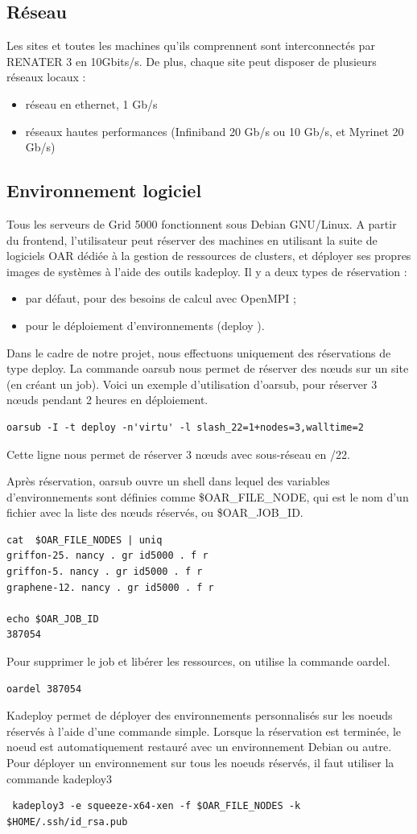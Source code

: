 \subsection{Réseau}
Les sites et toutes les machines qu'ils comprennent sont interconnectés par RENATER 3 en 10Gbits/s. De
plus, chaque site peut disposer de plusieurs réseaux locaux :
\begin{itemize}
\item réseau en ethernet, 1 Gb/s
\item réseaux hautes performances (Infiniband 20 Gb/s ou 10 Gb/s, et Myrinet 20 Gb/s)
\end{itemize}

  \subsection{Environnement logiciel}
Tous les serveurs de Grid 5000 fonctionnent sous Debian GNU/Linux.
A partir du frontend, l'utilisateur peut réserver des machines en utilisant la suite de logiciels OAR dédiée à
la gestion de ressources de clusters, et déployer ses propres images de systèmes à l'aide des outils kadeploy.
Il y a deux types de réservation :
\begin{itemize}
\item par défaut, pour des besoins de calcul avec OpenMPI ;
\item pour le déploiement d'environnements (deploy ).
\end{itemize}
Dans le cadre de notre projet, nous effectuons uniquement des réservations de type deploy. La commande oarsub nous permet de réserver des nœuds sur un site (en créant un job). Voici un exemple d'utilisation d'oarsub, pour réserver 3 nœuds pendant 2 heures en déploiement.
\begin{lstlisting}
oarsub -I -t deploy -n'virtu' -l slash_22=1+nodes=3,walltime=2
\end{lstlisting}
Cette ligne nous permet de réserver 3 nœuds avec sous-réseau en /22.

Après réservation, oarsub ouvre un shell dans lequel des variables d'environnements sont définies comme \$OAR\_FILE\_NODE, qui est le nom d'un fichier avec la liste des nœuds réservés, ou \$OAR\_JOB\_ID.
\begin{lstlisting}
cat  $OAR_FILE_NODES | uniq
griffon-25. nancy . gr id5000 . f r
griffon-5. nancy . gr id5000 . f r
graphene-12. nancy . gr id5000 . f r

echo $OAR_JOB_ID
387054
\end{lstlisting}
Pour supprimer le job et libérer les ressources, on utilise la commande oardel.
\begin{lstlisting}
oardel 387054
\end{lstlisting}
Kadeploy permet de déployer des environnements personnalisés sur les noeuds réservés à l'aide d'une commande simple. Lorsque la réservation est terminée, le noeud est automatiquement restauré avec un environnement Debian ou autre.
Pour déployer un environnement sur tous les noeuds réservés, il faut utiliser la commande kadeploy3
\begin{lstlisting}
 kadeploy3 -e squeeze-x64-xen -f $OAR_FILE_NODES -k $HOME/.ssh/id_rsa.pub
\end{lstlisting}

